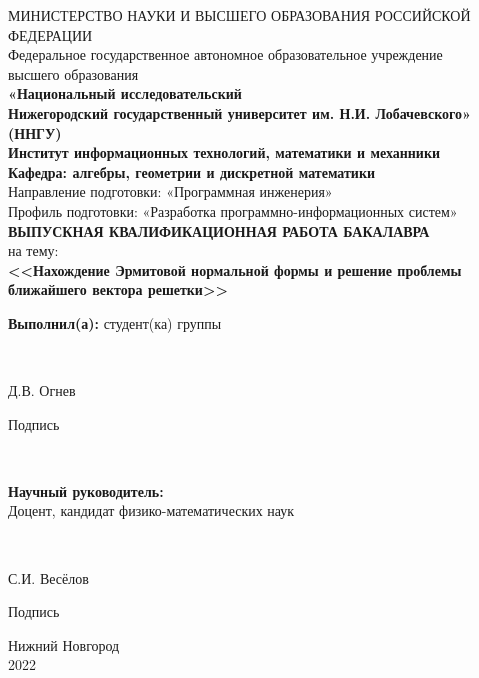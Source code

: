 \begin{titlepage}
\newpage

\begin{center}
	МИНИСТЕРСТВО НАУКИ И ВЫСШЕГО ОБРАЗОВАНИЯ РОССИЙСКОЙ ФЕДЕРАЦИИ \\
	\fontsize{14}{12}\selectfont
	Федеральное государственное автономное образовательное учреждение\\ высшего образования \\
	
	\textbf
	{«Национальный исследовательский \\ Нижегородский государственный
	 университет им. Н.И. Лобачевского» \\ (ННГУ)} \\
	\hfill \break
	\hfill \break
	\hfill \break
	\textbf{Институт информационных технологий, математики и механники} \\
	\hfill \break
	\hfill \break
	\textbf{Кафедра: алгебры, геометрии и дискретной математики} \\
	\hfill \break
	\hfill \break
	Направление подготовки: «Программная инженерия» \\
	\fontsize{13}{12}\selectfont
	Профиль подготовки: «Разработка программно-информационных систем» \\
	\fontsize{14}{12}\selectfont
	\hfill \break
	\hfill \break
	\hfill \break
	\textbf{ВЫПУСКНАЯ КВАЛИФИКАЦИОННАЯ РАБОТА БАКАЛАВРА} \\
	\vspace{1em}
	на тему: \\
	\textbf{<<Нахождение Эрмитовой нормальной формы и решение проблемы ближайшего вектора решетки>>} \\
\end{center}

\vspace{7em}

\fontsize{14}{12}\selectfont
\hfill\parbox{8cm}{
	\textbf{Выполнил(а):} студент(ка) группы \makebox[1cm]{\hrulefill}
} \\
\vspace{1em}
\hfill\parbox{7cm}{
	\underline{\hspace{4cm}} Д.В. Огнев
	\begin{center}
	Подпись
	\end{center}
}\\
\vspace{1em}
\hfill\parbox{8cm}{
	\textbf{Научный руководитель:} \\
	Доцент, кандидат физико-математических наук
} \\
\vspace{1em}
\hfill\parbox{7cm}{
	\underline{\hspace{4cm}} С.И. Весёлов
	\begin{center}
	Подпись
	\end{center}
}


\vspace{\fill}

\begin{center}
Нижний Новгород \\2022
\end{center}

\end{titlepage}
\clearpage